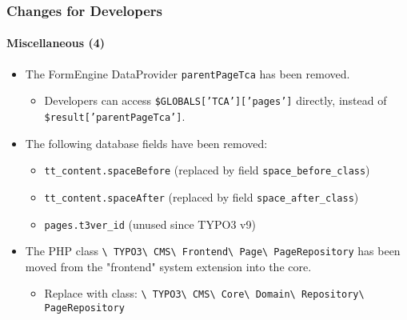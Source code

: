 \begin{frame}[fragile]
	\frametitle{Changes for Developers}
	\framesubtitle{Miscellaneous (4)}

	\begin{itemize}
		\item The FormEngine DataProvider \texttt{parentPageTca} has been removed.

			\begin{itemize}\smaller
				\item[\ding{228}] Developers can access \texttt{\$GLOBALS['TCA']['pages']} directly, instead of \texttt{\$result['parentPageTca']}.
			\end{itemize}\normalsize

		\item The following database fields have been removed:

			\begin{itemize}\smaller
				\item \texttt{tt\_content.spaceBefore} (replaced by field \texttt{space\_before\_class})
				\item \texttt{tt\_content.spaceAfter} (replaced by field \texttt{space\_after\_class})
				\item \texttt{pages.t3ver\_id} (unused since TYPO3 v9)
			\end{itemize}\normalsize

		\item The PHP class
			\texttt{\textbackslash
				TYPO3\textbackslash
				CMS\textbackslash
				Frontend\textbackslash
				Page\textbackslash
				PageRepository} has been moved from the "frontend" system extension into the core.

			\begin{itemize}\smaller
				\item Replace with class:
					\texttt{\textbackslash
						TYPO3\textbackslash
						CMS\textbackslash
						Core\textbackslash
						Domain\textbackslash
						Repository\textbackslash
						PageRepository}
			\end{itemize}\normalsize

	\end{itemize}

\end{frame}


